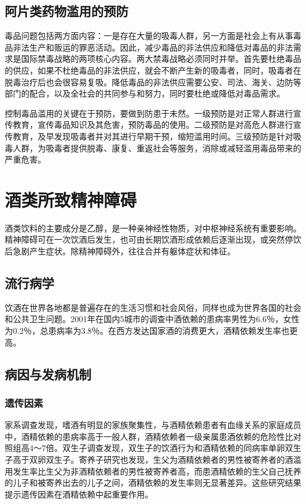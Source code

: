 \subsection{阿片类药物滥用的预防}

毒品问题包括两方面内容：一是存在大量的吸毒人群，另一方面是社会上有从事毒品非法生产和贩运的罪恶活动。因此，减少毒品的非法供应和降低对毒品的非法需求是国际禁毒战略的两项核心内容。两大禁毒战略必须同时并举。首先要杜绝毒品的供应，如果不杜绝毒品的非法供应，就会不断产生新的吸毒者，同时，吸毒者在脱毒治疗后也会很容易复吸。降低毒品的非法供应需要公安、司法、海关、边防等部门的配合，以及全社会的共同参与和努力，同时要杜绝或降低对毒品需求。

控制毒品滥用的关键在于预防，要做到防患于未然。一级预防是对正常人群进行宣传教育，宣传毒品知识及其危害，预防毒品的使用。二级预防是对高危人群进行宣传教育，及早发现吸毒者并对其进行早期干预，缩短滥用时间。三级预防是针对吸毒人群，为吸毒者提供脱毒、康复、重返社会等服务，消除或减轻滥用毒品带来的严重危害。

\section{酒类所致精神障碍}

酒类饮料的主要成分是乙醇，是一种亲神经性物质，对中枢神经系统有重要影响。精神障碍可在一次饮酒后发生，也可由长期饮酒形成依赖后逐渐出现，或突然停饮后急剧产生症状。除精神障碍外，往往合并有躯体症状和体征。

\subsection{流行病学}

饮酒在世界各地都是普遍存在的生活习惯和社会风俗，同样也成为世界各国的社会和公共卫生问题。2001年在国内5城市的调查中酒依赖的患病率男性为6.6％，女性为0.2％，总患病率为3.8％。在西方发达国家酒的消费更大，酒精依赖发生率也更高。

\subsection{病因与发病机制}

\subsubsection{遗传因素}

家系调查发现，嗜酒有明显的家族聚集性，与酒精依赖患者有血缘关系的家庭成员中，酒精依赖的患病率高于一般人群，酒精依赖者一级亲属患酒依赖的危险性比对照组高4～7倍。双生子调查发现，双生子的饮酒行为和酒精依赖的同病率单卵双生子高于双卵双生子。寄养子研究也发现，生父为酒精依赖者的男性被寄养者的酒滥用发生率比生父为非酒精依赖者的男性被寄养者高，而患酒精依赖的生父自己抚养的儿子和被寄养出去的儿子之间，酒精依赖的发生率则无显著差异。这些研究结果提示遗传因素在酒精依赖中起重要作用。

